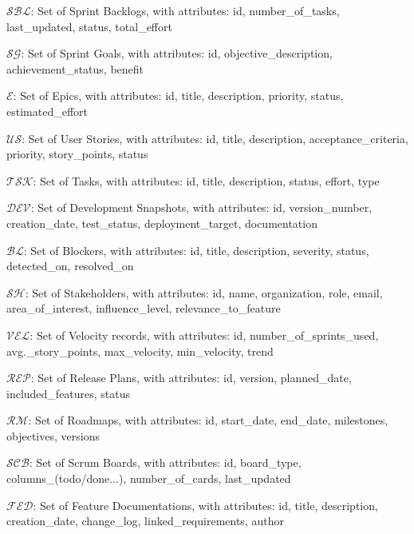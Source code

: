\documentclass[12pt]{article}
\begin{document}
    \item $ \mathcal{SBL} $: Set of Sprint Backlogs, with attributes: id, number\_of\_tasks, last\_updated, status, total\_effort
    \item $ \mathcal{SG} $: Set of Sprint Goals, with attributes: id, objective\_description, achievement\_status, benefit
    \item $ \mathcal{E} $: Set of Epics, with attributes: id, title, description, priority, status, estimated\_effort
    \item $ \mathcal{US} $: Set of User Stories, with attributes: id, title, description, acceptance\_criteria, priority, story\_points, status
    \item $ \mathcal{TSK} $: Set of Tasks, with attributes: id, title, description, status, effort, type
    \item $ \mathcal{DEV} $: Set of Development Snapshots, with attributes: id, version\_number, creation\_date, test\_status, deployment\_target, documentation
    \item $ \mathcal{BL} $: Set of Blockers, with attributes: id, title, description, severity, status, detected\_on, resolved\_on
    \item $ \mathcal{SH} $: Set of Stakeholders, with attributes: id, name, organization, role, email, area\_of\_interest, influence\_level, relevance\_to\_feature
    \item $ \mathcal{VEL} $: Set of Velocity records, with attributes: id, number\_of\_sprints\_used, avg.\_story\_points, max\_velocity, min\_velocity, trend
    \item $ \mathcal{REP} $: Set of Release Plans, with attributes: id, version, planned\_date, included\_features, status
    \item $ \mathcal{RM} $: Set of Roadmaps, with attributes: id, start\_date, end\_date, milestones, objectives, versions
    \item $ \mathcal{SCB} $: Set of Scrum Boards, with attributes: id, board\_type, columns\_(todo/done...), number\_of\_cards, last\_updated
    \item $ \mathcal{FED} $: Set of Feature Documentations, with attributes: id, title, description, creation\_date, change\_log, linked\_requirements, author
\end{document}
